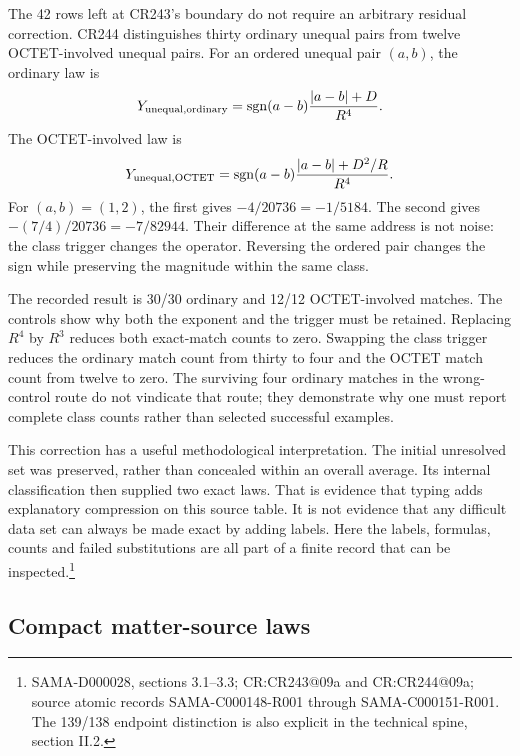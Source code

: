The 42 rows left at CR243's boundary do not require an arbitrary residual correction. CR244 distinguishes thirty ordinary unequal pairs from twelve OCTET-involved unequal pairs. For an ordered unequal pair $(a,b)$, the ordinary law is
\begin{equation}
Y_{\rm unequal,ordinary}
=\operatorname{sgn}(a-b)\frac{|a-b|+D}{R^4}.
\label{v2c3:ordinarypair}
\end{equation}
The OCTET-involved law is
\begin{equation}
Y_{\rm unequal,OCTET}
=\operatorname{sgn}(a-b)\frac{|a-b|+D^2/R}{R^4}.
\label{v2c3:octetpair}
\end{equation}
For $(a,b)=(1,2)$, the first gives $-4/20736=-1/5184$. The second gives $-(7/4)/20736=-7/82944$. Their difference at the same address is not noise: the class trigger changes the operator. Reversing the ordered pair changes the sign while preserving the magnitude within the same class.

The recorded result is 30/30 ordinary and 12/12 OCTET-involved matches. The controls show why both the exponent and the trigger must be retained. Replacing $R^4$ by $R^3$ reduces both exact-match counts to zero. Swapping the class trigger reduces the ordinary match count from thirty to four and the OCTET match count from twelve to zero. The surviving four ordinary matches in the wrong-control route do not vindicate that route; they demonstrate why one must report complete class counts rather than selected successful examples.

This correction has a useful methodological interpretation. The initial unresolved set was preserved, rather than concealed within an overall average. Its internal classification then supplied two exact laws. That is evidence that typing adds explanatory compression on this source table. It is not evidence that any difficult data set can always be made exact by adding labels. Here the labels, formulas, counts and failed substitutions are all part of a finite record that can be inspected.\footnote{SAMA-D000028, sections 3.1--3.3; CR:CR243@09a and CR:CR244@09a; source atomic records SAMA-C000148-R001 through SAMA-C000151-R001. The 139/138 endpoint distinction is also explicit in the technical spine, section II.2.}

\subsection{Compact matter-source laws}

